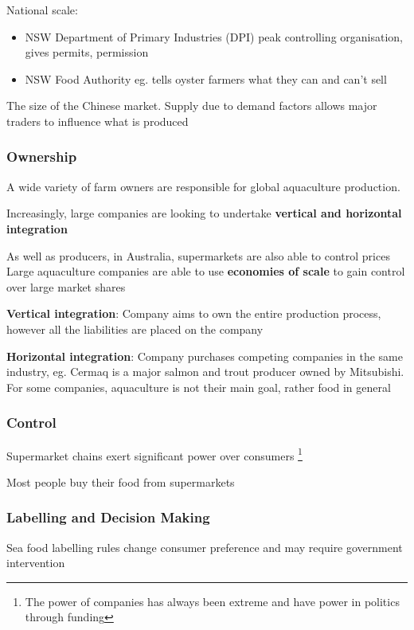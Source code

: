 			National scale:
			\begin{itemize}
				\item NSW Department of Primary Industries (DPI) peak controlling organisation, gives permits, permission
				\item NSW Food Authority eg. tells oyster farmers what they can and can't sell
			\end{itemize}

			The size of the Chinese market. Supply due to demand factors allows major traders to influence what is produced

			\subsubsection{Ownership}
				A wide variety of farm owners are responsible for global aquaculture production.

				Increasingly, large companies are looking to undertake \textbf{vertical and horizontal integration}
				
				As well as producers, in Australia, supermarkets are also able to control prices 
				Large aquaculture companies are able to use \textbf{economies of scale} to gain control over large market shares

				\textbf{Vertical integration}: Company aims to own the entire production process, however all the liabilities are placed on the company

				\textbf{Horizontal integration}: Company purchases competing companies in the same industry, eg. Cermaq is a major salmon and trout producer owned by Mitsubishi. For some companies, aquaculture is not their main goal, rather food in general

			\subsubsection{Control}
				 Supermarket chains exert significant power over consumers \footnote{The power of companies has always been extreme and have power in politics through funding}

				 Most people buy their food from supermarkets

			\subsubsection{Labelling and Decision Making}
				Sea food labelling rules change consumer preference and may require government intervention

